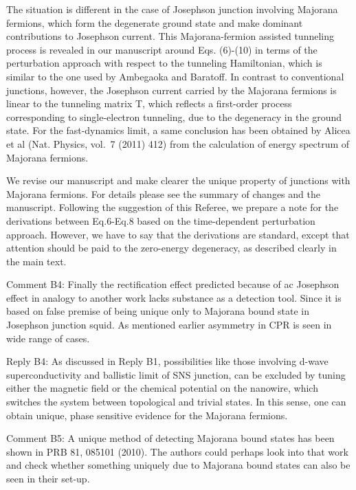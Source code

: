 \documentclass[11pt]{article}
\begin{document}
The situation is different in the case of Josephson junction involving
Majorana fermions, which form the degenerate ground state and make
dominant contributions to Josephson current. This Majorana-fermion
assisted tunneling process is revealed in our manuscript around Eqs.
(6)-(10) in terms of the perturbation approach with respect to the
tunneling Hamiltonian, which is similar to the one used by Ambegaoka and
Baratoff. In contrast to conventional junctions, however, the Josephson
current carried by the Majorana fermions is linear to the tunneling
matrix T, which reflects a first-order process corresponding to
single-electron tunneling, due to the degeneracy in the ground state.
For the fast-dynamics limit, a same conclusion has been obtained by
Alicea et al (Nat. Physics, vol.~7 (2011) 412) from the calculation of
energy spectrum of Majorana fermions.

We revise our manuscript and make clearer the unique property of
junctions with Majorana fermions. For details please see the summary of
changes and the manuscript. Following the suggestion of this Referee, we
prepare a note for the derivations between Eq.6-Eq.8 based on the
time-dependent perturbation approach. However, we have to say that the
derivations are standard, except that attention should be paid to the
zero-energy degeneracy, as described clearly in the main text.

Comment B4: Finally the rectification effect predicted because of ac
Josephson effect in analogy to another work lacks substance as a
detection tool. Since it is based on false premise of being unique only
to Majorana bound state in Josephson junction squid. As mentioned
earlier asymmetry in CPR is seen in wide range of cases.

Reply B4: As discussed in Reply B1, possibilities like those involving
d-wave superconductivity and ballistic limit of SNS junction, can be
excluded by tuning either the magnetic field or the chemical potential
on the nanowire, which switches the system between topological and
trivial states. In this sense, one can obtain unique, phase sensitive
evidence for the Majorana fermions.

Comment B5: A unique method of detecting Majorana bound states has been
shown in PRB 81, 085101 (2010). The authors could perhaps look into that
work and check whether something uniquely due to Majorana bound states
can also be seen in their set-up.
\end{document}
